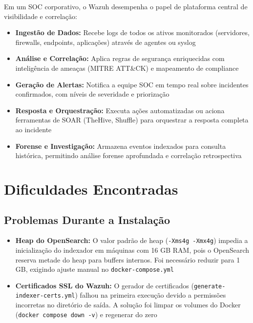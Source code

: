 \documentclass[12pt,a4paper]{article}
\begin{document}
    Em um SOC corporativo, o Wazuh desempenha o papel de plataforma central de visibilidade e correlação:
    \begin{itemize}
        \item \textbf{Ingestão de Dados:} Recebe logs de todos os ativos monitorados (servidores, firewalls, endpoints, aplicações) através de agentes ou syslog
        \item \textbf{Análise e Correlação:} Aplica regras de segurança enriquecidas com inteligência de ameaças (MITRE ATT\&CK) e mapeamento de compliance
        \item \textbf{Geração de Alertas:} Notifica a equipe SOC em tempo real sobre incidentes confirmados, com níveis de severidade e priorização
        \item \textbf{Resposta e Orquestração:} Executa ações automatizadas ou aciona ferramentas de SOAR (TheHive, Shuffle) para orquestrar a resposta completa ao incidente
        \item \textbf{Forense e Investigação:} Armazena eventos indexados para consulta histórica, permitindo análise forense aprofundada e correlação retrospectiva
    \end{itemize}

    \newpage
    \section{Dificuldades Encontradas}

    \subsection{Problemas Durante a Instalação}

    \begin{itemize}
        \item \textbf{Heap do OpenSearch:} O valor padrão de heap (\texttt{-Xms4g -Xmx4g}) impedia a inicialização do indexador em máquinas com 16 GB RAM, pois o OpenSearch reserva metade do heap para buffers internos. Foi necessário reduzir para 1 GB, exigindo ajuste manual no \texttt{docker-compose.yml}
        \item \textbf{Certificados SSL do Wazuh:} O gerador de certificados (\texttt{generate-indexer-certs.yml}) falhou na primeira execução devido a permissões incorretas no diretório de saída. A solução foi limpar os volumes do Docker (\texttt{docker compose down -v}) e regenerar do zero
    \end{itemize}
\end{document}
